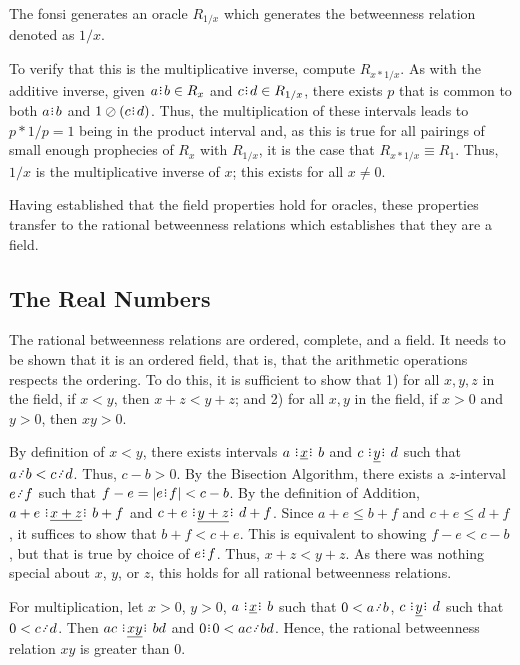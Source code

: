 \documentclass[12pt]{article}
\begin{document}
\begin{enumerate}
    The fonsi generates an oracle $R_{1/x}$ which generates the betweenness relation denoted as $1/x$. 

    To verify that this is the multiplicative inverse, compute $R_{x*1/x}$. As with the additive inverse, given $a\rint b \in R_x$ and $c\rint d \in R_{1/x}$, there exists $p$ that is common to both $a\rint b$ and $1 \oslash (c\rint d)$. Thus, the multiplication of these intervals leads to $p *1/p = 1$ being in the product interval and, as this is true for all pairings of small enough prophecies of $R_{x}$ with $R_{1/x}$, it is the case that $R_{x*1/x} \equiv R_1$. Thus, $1/x$ is the multiplicative inverse of $x$; this exists for all $x \neq 0$. 

\end{enumerate}

Having established that the field properties hold for oracles, these properties transfer to the rational betweenness relations which establishes that they are a field. 


\subsection{The Real Numbers}

The rational betweenness relations are ordered, complete, and a field. It needs to be shown that it is an ordered field, that is, that the arithmetic operations respects the ordering. To do this, it is sufficient to show that 1) for all $x, y, z$ in the field, if $x<y$, then $x + z < y +z$; and 2) for all $x, y$ in the field, if $x >0$ and $y>0$, then $xy > 0 $.

By definition of $x < y$, there exists intervals $ a \xrel[x] b$ and $c \xrel[y] d$ such that $a \lte b < c \lte d$. Thus, $c-b > 0$. By the Bisection Algorithm, there exists a $z$-interval $e \lte f$ such that $f-e = |e\rint f| < c-b$. By the definition of Addition, $a+e \xrel[x+z] b+f$ and $c+e \xrel[y+z] d+f$. Since $a+e \leq  b+f$ and $c+e \leq d+f$, it suffices to show that $b+f < c+e$. This is equivalent to showing $f-e < c-b$, but that is true by choice of $e\rint f$. Thus, $x+z < y+z$. As there was nothing special about $x$, $y$, or $z$, this holds for all rational betweenness relations. 

For multiplication, let $x >0 $, $y >0$, $a \xrel b$ such that $0<a \lte b$, $c \xrel[y] d$ such that $0 < c \lte d$. Then $ac \xrel[xy] bd$ and $0\rint 0 < ac \lte bd$. Hence, the rational betweenness relation $xy$ is greater than 0. 
\end{document}

